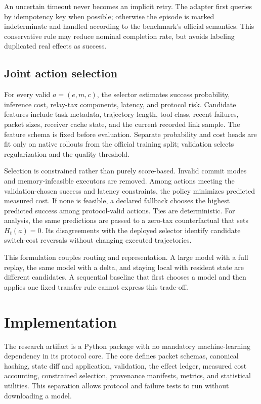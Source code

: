 \documentclass[10pt]{article}
\begin{document}
An uncertain timeout never becomes an implicit retry. The adapter first
queries by idempotency key when possible; otherwise the episode is marked
indeterminate and handled according to the benchmark's official semantics.
This conservative rule may reduce nominal completion rate, but avoids
labeling duplicated real effects as success.

\subsection{Joint action selection}
\label{sec:policy}

For every valid $a=(e,m,c)$, the selector estimates success probability,
inference cost, relay-tax components, latency, and protocol risk. Candidate
features include task metadata, trajectory length, tool class, recent
failures, packet sizes, receiver cache state, and the current recorded link
sample. The feature schema is fixed before evaluation. Separate probability
and cost heads are fit only on native rollouts from the official training
split; validation selects regularization and the quality threshold.

Selection is constrained rather than purely score-based. Invalid commit modes
and memory-infeasible executors are removed. Among actions meeting the
validation-chosen success and latency constraints, the policy minimizes
predicted measured cost. If none is feasible, a declared fallback chooses the
highest predicted success among protocol-valid actions. Ties are deterministic.
For analysis, the same predictions are passed to a zero-tax counterfactual
that sets $H_t(a)=0$. Its disagreements with the deployed selector identify
candidate switch-cost reversals without changing executed trajectories.

This formulation couples routing and representation. A large model with a
full replay, the same model with a delta, and staying local with resident
state are different candidates. A sequential baseline that first chooses a
model and then applies one fixed transfer rule cannot express this trade-off.

\section{Implementation}
\label{sec:implementation}

The research artifact is a Python package with no mandatory machine-learning
dependency in its protocol core. The core defines packet schemas, canonical
hashing, state diff and application, validation, the effect ledger, measured
cost accounting, constrained selection, provenance manifests, metrics, and
statistical utilities. This separation allows protocol and failure tests to
run without downloading a model.
\end{document}

